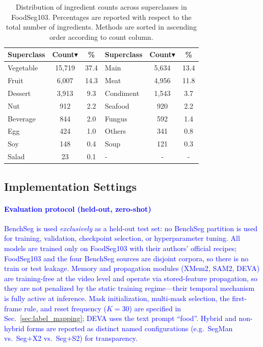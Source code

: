 \documentclass[preprint,12pt]{elsarticle}
\newcommand{\change}[1]{\textcolor{blue}{#1}}
\begin{document}
\begin{table}[t]
\centering
\small
\setlength{\tabcolsep}{6pt}
\caption{Distribution of ingredient counts across superclasses in FoodSeg103. Percentages are reported with respect to the total number of ingredients. Methods are sorted in ascending order according to count column.}
\label{table:foodseg_super_classes}

\begin{tabular}{l c c l c c}
\toprule
\textbf{Superclass} & {\raggedleft\textbf{Count$\blacktriangledown$}} & {\textbf{\%}}
& \textbf{Superclass} & {\textbf{Count$\blacktriangledown$}} & {\textbf{\%}} \\
\midrule

Vegetable & 15,719 & 37.4
& Main & 5,634 & 13.4 \\

\rowcolor{gray!12}Fruit & 6,007 & 14.3
& Meat & 4,956 & 11.8 \\

Dessert & 3,913 & 9.3
& Condiment & 1,543 & 3.7 \\

\rowcolor{gray!12}Nut & 912 & 2.2
& Seafood & 920 & 2.2 \\

Beverage & 844 & 2.0
& Fungus & 592 & 1.4 \\

\rowcolor{gray!12}Egg & 424 & 1.0
& Others & 341 & 0.8 \\

Soy & 148 & 0.4
& Soup & 121 & 0.3 \\

\rowcolor{gray!12}Salad & 23 & 0.1
& - & - & - \\
\bottomrule
\end{tabular}
\end{table}



\subsection{Implementation Settings}
\label{sec:implementation_settings}

\change{\paragraph{Evaluation protocol (held-out, zero-shot)}
BenchSeg is used \emph{exclusively} as a held-out test set: no BenchSeg partition is used for training, validation, checkpoint selection, or hyperparameter tuning. All models are trained only on FoodSeg103 with their authors' official recipes; FoodSeg103 and the four BenchSeg sources are disjoint corpora, so there is no train or test leakage. Memory and propagation modules (XMem2, SAM2, DEVA) are training-free at the video level and operate via stored-feature propagation, so they are not penalized by the static training regime---their temporal mechanism is fully active at inference. Mask initialization, multi-mask selection, the first-frame rule, and reset frequency ($K{=}30$) are specified in Sec.~\ref{sec:label_mapping}; DEVA uses the text prompt ``food''. Hybrid and non-hybrid forms are reported as distinct named configurations (e.g.\ SegMan vs.\ Seg+X2 vs.\ Seg+S2) for transparency.}
\end{document}
